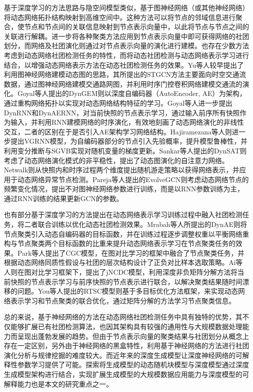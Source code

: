 基于深度学习的方法思路与隐空间模型类似，基于图神经网络（或其他神经网络）将动态网络拓扑结构映射到高维空间中。这种方法可以将节点的邻域信息进行聚合，使节点和节点间的关联信息映射到节点表示向量中，以此将节点与节点之间的关联进行解耦。进一步将各种聚类方法应用到节点表示向量中即可获得网络的社团划分，而网络及社团演化则通过对节点表示向量的演化进行建模。也存在少数方法考虑到动态网络社团检测任务的特性，而将动态社团检测与动态网络表示学习进行结合，以增强动态网络表示方法在动态社团检测任务的效果。Yu等人较早提出了利用图神经网络建模动态图的思路，其所提出的STGCN\cite{yu2017spatio}方法主要面向时空交通流数据，通过图神经网络建模交通路网图，并利用时序门控卷积网络建模交通流的演化。Goyal等人提出的DynGEM\cite{goyal2018dyngem}则以深度自编码器（AutoEncoder, AE）为架构，通过重构网络拓扑以实现对动态网络结构特征的学习。Goyal等人进一步提出DynRNN和DynAERNN\cite{goyal2020dyngraph2vec}，对当前快照的节点表示学习，通过输入前序所有快照作为输入，并利用RNN建模网络的时序演化，有效地刻画了动态网络演化的非线性交互，二者的区别在于是否引入AE架构学习网络结构。Hajiramezana等人\cite{hajiramezanali2019variational}则进一步提出VGRNN模型，为自编码器部分的节点引入先验概率，提升模型鲁棒性，并利用变分推断与SGVB实现对随机变量的梯度更新。Sankar等人提出的DynSAT\cite{aravind2019dysat}则考虑了动态网络演化模式的非平稳性，提出了动态图演化的自注意力网络。Netwalk\cite{yu2018netwalk}则从快照内和时序过程两个维度提出随机游走策略以获得网络表示，并应用于动态网络异常节点检测。Pareja等人提出的EvolveGCN\cite{pareja2020evolvegcn}则考虑动态网络节点的频繁变化情况，提出不对图神经网络参数进行训练，而是以RNN参数训练为主，通过RNN训练的结果更新GCN的参数。

也有部分基于深度学习的方法提出在动态网络表示学习训练过程中融入社团检测任务，将二者联合训练以优化动态社团检测效果。Mrabah等人所提出的DynAE\cite{mrabah2019deep}则将节点聚类引入动态自编码器的目标函数，并在训练过程逐步调整权重以平衡网络重构与节点聚类两个目标函数的比重来提升动态网络表示学习在节点聚类任务的效果。Park等人\cite{park2022cgc}提出了CGC模型，在图对比学习的框架中融合了节点聚类任务，并根据动态网络同质性假设与社团的层次结构设计了正负对比样本选取策略。Ai等人\cite{10502242}则在图对比学习框架下，提出了jNCDC模型，利用深度非负矩阵分解方法将当前快照的节点表示学习与前序快照的节点表示进行联合，以解决聚类结果随时间漂移的问题。You等人\cite{you2021robust}提出的RTSC模型则基于多目标优化方法框架，来实现动态网络表示学习和节点聚类的联合优化，通过矩阵分解的方法学习节点聚类信息。

总的来说，基于神经网络的方法在动态网络社团检测任务中具有独特的优势，其不仅能够扩展已有社团检测算法，也因其架构具有较强的通用性与大规模数据处理能力而呈现出蓬勃发展的趋势。但由于节点表示向量的聚类结果与社团划分从概念上存在一定区别，另外由于神经网络的黑盒特性，利用基于神经网络的方法进行社团演化分析与规律挖掘的难度较大。而近年来的深度生成模型让深度神经网络的可解释性参数学习提供了可能。探索将生成模型的动态随机块模型与深度模型通过深度生成模型架构进行结合，实现扩展生成模型的大规模数据应用能力与深度模型的可解释能力也是本文的研究重点之一。
